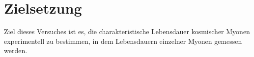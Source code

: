 \section{Zielsetzung}
Ziel dieses Versuches ist es, die charakteristische Lebensdauer kosmischer Myonen experimentell zu bestimmen,
in dem Lebensdauern einzelner Myonen gemessen werden. 